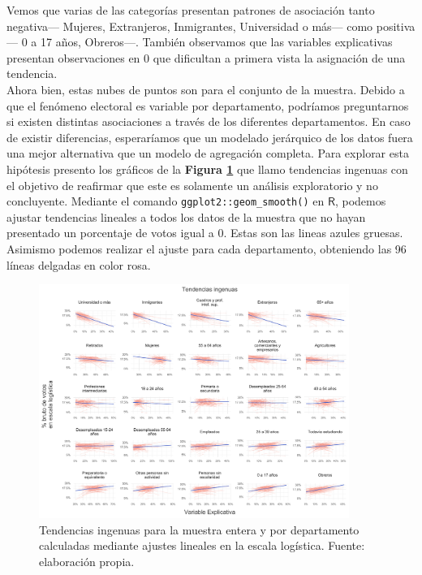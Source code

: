 Vemos que varias de las categorías presentan patrones de asociación tanto negativa--- Mujeres, Extranjeros, Inmigrantes, Universidad o más--- como positiva--- 0 a 17 años, Obreros---. También observamos que las variables explicativas presentan observaciones en 0 que dificultan a primera vista la asignación de una tendencia.\\

Ahora bien, estas nubes de puntos son para el conjunto de la muestra. Debido a que el fenómeno electoral es variable por departamento, podríamos preguntarnos si existen distintas asociaciones a través de los diferentes departamentos. En caso de existir diferencias, esperaríamos que un modelado jerárquico de los datos fuera una mejor alternativa que un modelo de agregación completa. Para explorar esta hipótesis presento los gráficos de la \textbf{Figura \ref{fig:Tendencias_Ingenuas_Muestra}} que llamo tendencias ingenuas con el objetivo de reafirmar que este es solamente un análisis exploratorio y no concluyente. Mediante el comando \verb|ggplot2::geom_smooth()| en $\mathsf{R}$, podemos ajustar tendencias lineales a todos los datos de la muestra que no hayan presentado un porcentaje de votos igual a 0. Estas son las lineas azules gruesas. Asimismo podemos realizar el ajuste para cada departamento, obteniendo las 96 líneas delgadas en color rosa.\\ 

\begin{figure}
	\centering
	\includegraphics[width = 0.9\textwidth]{Figs/AED/Tend_Ingenuas_Todas_MUESTRA}
	\caption{Tendencias ingenuas para la muestra entera y por departamento calculadas mediante ajustes lineales en la escala logística. Fuente: elaboración propia.}
	\label{fig:Tendencias_Ingenuas_Muestra}	
\end{figure}

